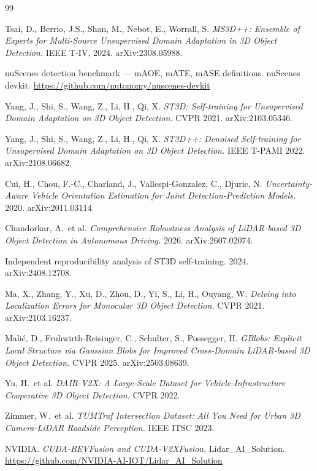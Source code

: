 \documentclass[10pt,letterpaper]{article}
\begin{document}
\newpage
{\footnotesize
\begin{thebibliography}{99}
\setlength{\itemsep}{1.5pt}

 Tsai, D., Berrio, J.S., Shan, M., Nebot, E., Worrall, S.
  \emph{MS3D++: Ensemble of Experts for Multi-Source Unsupervised Domain Adaptation in 3D
  Object Detection.} IEEE T-IV, 2024. arXiv:2308.05988.

 nuScenes detection benchmark --- mAOE, mATE, mASE definitions.
  nuScenes devkit. \url{https://github.com/nutonomy/nuscenes-devkit}

 Yang, J., Shi, S., Wang, Z., Li, H., Qi, X.
  \emph{ST3D: Self-training for Unsupervised Domain Adaptation on 3D Object Detection.}
  CVPR 2021. arXiv:2103.05346.

 Yang, J., Shi, S., Wang, Z., Li, H., Qi, X.
  \emph{ST3D++: Denoised Self-training for Unsupervised Domain Adaptation on 3D Object
  Detection.} IEEE T-PAMI 2022. arXiv:2108.06682.

 Cui, H., Chou, F.-C., Charland, J., Vallespi-Gonzalez, C., Djuric, N.
  \emph{Uncertainty-Aware Vehicle Orientation Estimation for Joint Detection-Prediction
  Models.} 2020. arXiv:2011.03114.

 Chandorkar, A.\ et al.
  \emph{Comprehensive Robustness Analysis of LiDAR-based 3D Object Detection in Autonomous
  Driving.} 2026. arXiv:2607.02074.

 Independent reproducibility analysis of ST3D self-training. 2024.
  arXiv:2408.12708.

 Ma, X., Zhang, Y., Xu, D., Zhou, D., Yi, S., Li, H., Ouyang, W.
  \emph{Delving into Localization Errors for Monocular 3D Object Detection.} CVPR 2021.
  arXiv:2103.16237.

 Mali\'{c}, D., Fruhwirth-Reisinger, C., Schulter, S., Possegger, H.
  \emph{GBlobs: Explicit Local Structure via Gaussian Blobs for Improved Cross-Domain
  LiDAR-based 3D Object Detection.} CVPR 2025. arXiv:2503.08639.

 Yu, H.\ et al.
  \emph{DAIR-V2X: A Large-Scale Dataset for Vehicle-Infrastructure Cooperative 3D Object
  Detection.} CVPR 2022.

 Zimmer, W.\ et al.
  \emph{TUMTraf Intersection Dataset: All You Need for Urban 3D Camera-LiDAR Roadside
  Perception.} IEEE ITSC 2023.

 NVIDIA. \emph{CUDA-BEVFusion and CUDA-V2XFusion}, Lidar\_AI\_Solution.
  \url{https://github.com/NVIDIA-AI-IOT/Lidar_AI_Solution}

\end{thebibliography}}
\end{document}
